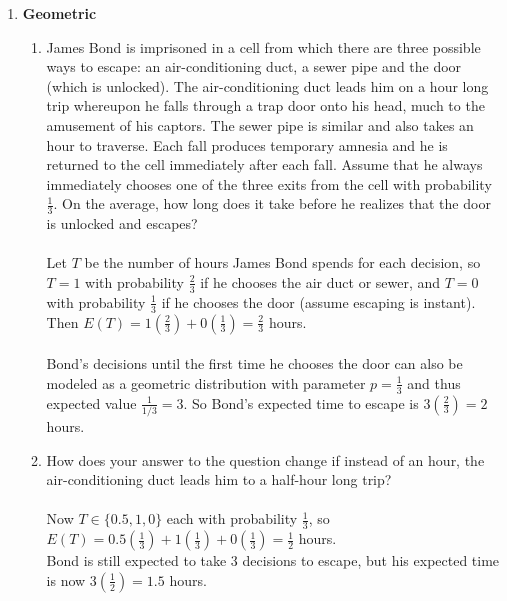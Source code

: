 \documentclass[11pt,fleqn]{article}
\begin{document}
\begin{enumerate}
\newpage
\item \textbf{Geometric}
\begin{enumerate}
\item James Bond is imprisoned in a cell from which there are three possible ways to escape: an air-conditioning duct, 
a sewer pipe and the door (which is unlocked). The air-conditioning duct
leads him on a hour long trip whereupon he falls through a trap door onto his head, much to the
amusement of his captors. The sewer pipe is similar and also takes an hour to traverse. Each fall
produces temporary amnesia and he is returned to the cell immediately after each fall. Assume
that he always immediately chooses one of the three exits from the cell with probability $\frac 1 3$. On the
average, how long does it take before he realizes that the door is unlocked and escapes? \\\\ 
Let $T$ be the number of hours James Bond spends for each decision, so $T=1$ with probability $\frac23$ if he chooses the air duct or sewer, and $T=0$ with probability $\frac13$ if he chooses the door (assume escaping is instant). Then $E(T) = 1(\frac23)+0(\frac13) = \frac23$ hours. \\\\
Bond's decisions until the first time he chooses the door can also be modeled as a geometric distribution with parameter $p=\frac13$ and thus expected value $\frac1{1/3} = 3$. So Bond's expected time to escape is $3(\frac23) = 2$ hours. \\
\item How does your answer to the question change if instead of an hour, the air-conditioning duct leads him to a half-hour long trip? \\\\
Now $T \in \{0.5,1,0\}$ each with probability $\frac13$, so $E(T) = 0.5(\frac13)+1(\frac13)+0(\frac13) = \frac12$ hours. \\
Bond is still expected to take 3 decisions to escape, but his expected time is now $3(\frac12) = 1.5$ hours.
\end{enumerate}



\end{enumerate}
\end{document}
